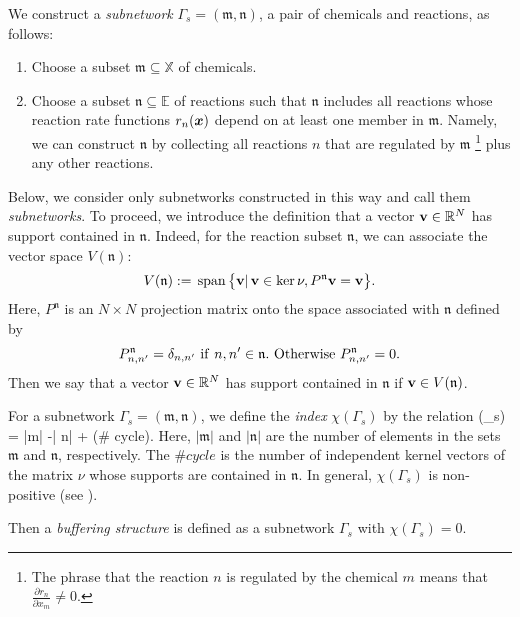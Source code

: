 \documentclass[ amsmath,amssymb,nofootinbib
]{revtex4-1}
\def\bal#1\eal{\begin{align}#1\end{align}}
\def\mbf#1{\mbox{\boldmath $#1$}}
\newcommand{\bR}{\mathbb{R}}
\newcommand{\p}{\partial}
\begin{document}
We construct a {\it subnetwork} $\Gamma_s = (\mathfrak m, \mathfrak n)$, a pair of chemicals and reactions, as follows:
\begin{enumerate}
\item Choose a subset $\mathfrak m \subseteq \mathbb X$ of chemicals.
\item Choose a subset $\mathfrak n \subseteq \mathbb E$ of reactions such that $\mathfrak n$  includes all reactions
whose reaction rate functions $r_n(\mbf{x})$ depend on at least one member in $\mathfrak m$. Namely, we can construct $\mathfrak n$ by collecting all reactions $n$ that are regulated by  $\mathfrak m$
\footnote{The phrase that the reaction $n$ is regulated by the chemical $m$ means that $\frac{\p r_n}{\p x_m} \not = 0$.}
 plus any other reactions.
\end{enumerate}
Below, we consider only subnetworks constructed in this way and  call them  {\em subnetworks}.
To proceed, we introduce the definition that a vector ${\bf v} \in\bR^{N}$ has support contained in $\mathfrak n$.
Indeed, for the reaction subset ${\mathfrak n}$,  we can associate the vector space $V({\mathfrak n})$:
$$
V({\mathfrak n})  :=   \, {\rm span}\, \bigl\{    {\bf v}   | \,  {\bf v} \in {\rm ker}\, \nu , P^{\mathfrak n}  {\bf v} =  {\bf v} \bigr\}.
$$
Here, $P^{\mathfrak n}$ is an $N \times N$ projection matrix onto the space associated with ${\mathfrak n}$ defined by
$$
P^{\mathfrak n}_{n,n'} = \delta_{n,n'}\   {\rm if } \  n,n' \in {\mathfrak n}.\  {\rm Otherwise } \ P^{\mathfrak n}_{n,n'} =0.
$$
Then we say that a vector ${\bf v} \in\bR^{N}$ has support contained in $\mathfrak n$
if ${\bf v} \in  V({\mathfrak n})$.


For a subnetwork $\Gamma_s = (\mathfrak m, \mathfrak n)$, we define the {\it index} $\chi(\Gamma_s)$ by the relation
\bal
\chi(\Gamma_s) = |\mathfrak m| -| \mathfrak n| + (\# cycle).
\eal
Here, $|\mathfrak m|$ and  $| \mathfrak n|$ are the number of elements in the sets $\mathfrak m$ and  $\mathfrak n$, respectively.
The $\# cycle$ is the number of independent  kernel vectors of the matrix $\nu$ whose supports are contained in $\mathfrak n$.
In general, $\chi(\Gamma_s)$ is non-positive (see \cite{OM}).

Then a {\it buffering structure} is defined as a subnetwork $\Gamma_s$ with $\chi(\Gamma_s) =0$.
\end{document}
